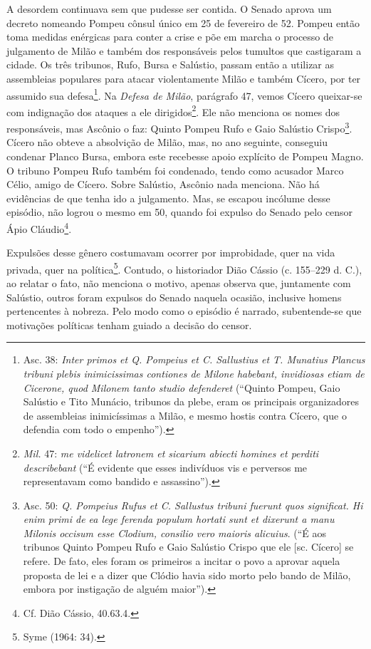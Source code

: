 A desordem continuava sem que pudesse ser contida. O Senado aprova um decreto
nomeando Pompeu cônsul único em 25 de fevereiro de 52.  Pompeu então toma
medidas enérgicas para conter a crise e põe em marcha o processo de julgamento
de Milão e também dos responsáveis pelos tumultos que castigaram a cidade. Os
três tribunos, Rufo, Bursa e Salústio, passam então a utilizar as assembleias
populares para atacar violentamente Milão e também Cícero, por ter assumido sua
defesa\footnote{Asc. 38: \emph{Inter primos et Q. Pompeius et C. Sallustius et
T. Munatius Plancus tribuni plebis inimicissimas contiones de Milone habebant,
invidiosas etiam de Cicerone, quod Milonem tanto studio defenderet} (``Quinto
Pompeu, Gaio Salústio e Tito Munácio, tribunos da plebe, eram os principais
organizadores de assembleias inimicíssimas a  Milão, e mesmo hostis contra
Cícero, que o defendia com todo o empenho'').}. Na \emph{Defesa de Milão},
parágrafo 47, vemos Cícero queixar-se com indignação dos ataques a ele
dirigidos\footnote{\emph{Mil.} 47: \emph{me videlicet latronem et
sicarium abiecti homines et perditi describebant} (``É evidente que esses
indivíduos vis e perversos me representavam como bandido e assassino'').}. Ele
não menciona os nomes dos responsáveis, mas Ascônio o faz: Quinto Pompeu Rufo e
Gaio Salústio Crispo\footnote{Asc. 50: \emph{Q. Pompeius Rufus et C. Sallustus
tribuni fuerunt quos significat. Hi enim primi de ea lege ferenda populum
hortati sunt et dixerunt a manu Milonis occisum esse Clodium, consilio vero
maioris alicuius}. (``É aos tribunos Quinto Pompeu Rufo e
Gaio Salústio Crispo que ele [sc. Cícero] se refere. De fato, eles foram os primeiros a incitar  o povo a aprovar aquela proposta de lei e a dizer que Clódio havia sido morto pelo
bando de Milão, embora por instigação de alguém maior”).}.  Cícero não obteve a
absolvição de Milão, mas, no ano seguinte, conseguiu condenar Planco Bursa,
embora este recebesse apoio explícito de Pompeu Magno. O tribuno Pompeu Rufo
também foi condenado, tendo como acusador Marco Célio, amigo de Cícero. Sobre
Salústio, Ascônio nada menciona. Não há evidências de que tenha ido a
julgamento. Mas, se escapou incólume desse episódio, não logrou o mesmo em 50,
quando foi expulso do Senado pelo censor Ápio Cláudio\footnote{ Cf. Dião
Cássio, 40.63.4.}. 

Expulsões desse gênero costumavam ocorrer por improbidade, quer na vida
privada, quer na política\footnote{Syme (1964: 34).}. Contudo, o historiador
Dião Cássio (c. 155--229 d. C.), ao relatar o fato, não menciona o motivo,
apenas observa que, juntamente com Salústio, outros foram expulsos do Senado
naquela ocasião, inclusive homens pertencentes à nobreza. Pelo modo como o
episódio é narrado, subentende-se que motivações políticas tenham guiado a
decisão do censor.

